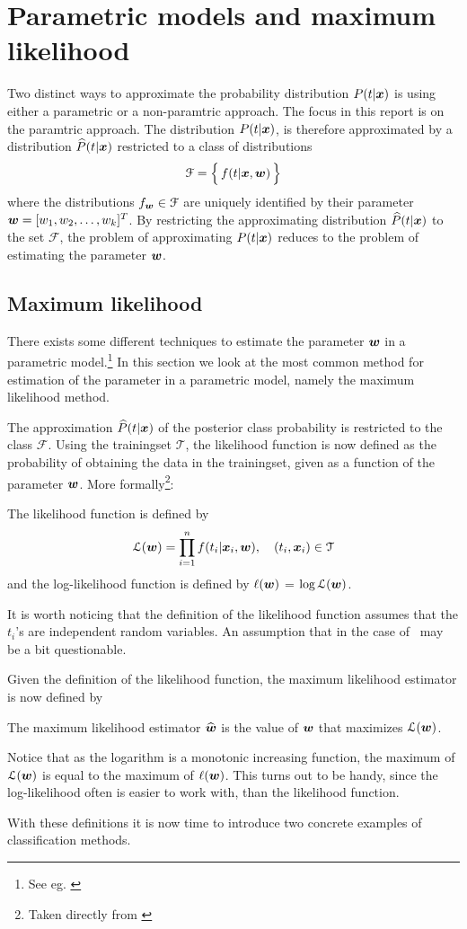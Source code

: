 \section{Parametric models and maximum likelihood}\label{sec:parametric-models-and-likelihood}
Two distinct ways to approximate the probability distribution $P(t|\boldsymbol{x})$ is using either a parametric or a non-paramtric approach. The focus in this report is on the paramtric approach. The distribution $P(t|\boldsymbol{x})$, is therefore approximated by a distribution $\widehat{P}(t|\boldsymbol{x})$ restricted to a class of distributions
\[
    \mathcal{F} = \Bigl\{\,f(t|\boldsymbol{x},\boldsymbol{w})\,\Bigr\}
\]
where the distributions $f_{\boldsymbol{w}}\in\mathcal{F}$ are uniquely identified by their parameter $\boldsymbol{w}=[w_1, w_2, \dots, w_k]^T$. By restricting the approximating distribution $\widehat{P}(t|\boldsymbol{x})$ to the set $\mathcal{F}$, the problem of approximating $P(t|\boldsymbol{x})$ reduces to the problem of estimating the parameter $\boldsymbol{w}$.

\subsection{Maximum likelihood}
There exists some different techniques to estimate the parameter $\boldsymbol{w}$ in a parametric model.\footnote{See eg. \citet[Sec.9]{wasserman04}} In this section we look at the most common method for estimation of the parameter in a parametric model, namely the maximum likelihood method.\par
The approximation $\widehat{P}(t|\boldsymbol{x})$ of the posterior class probability is restricted to the class $\mathcal{F}$. Using the trainingset $\mathcal{T}$, the likelihood function is now defined as the probability of obtaining the data in the trainingset, given as a function of the parameter $\boldsymbol{w}$. More formally\footnote{Taken directly from \citet[p.122]{wasserman04}}:
\begin{definition}
    The likelihood function is defined by
    \[
    \mathcal{L}(\boldsymbol{w}) = \prod_{i=1}^n f(t_i|\boldsymbol{x}_i,\boldsymbol{w}),\quad (t_i,\boldsymbol{x}_i)\in\mathcal{T}
    \]
    and the log-likelihood function is defined by $\ell(\boldsymbol{w})$ = $\log\mathcal{L(\boldsymbol{w})}$.
\end{definition}
It is worth noticing that the definition of the likelihood function assumes that the $t_i$'s are independent random variables. An assumption that in the case of \TFC\ may be a bit questionable. \par
Given the definition of the likelihood function, the maximum likelihood estimator is now defined by
\begin{definition}
    The maximum likelihood estimator $\widehat{\boldsymbol{w}}$ is the value of $\boldsymbol{w}$ that maximizes $\mathcal{L}(\boldsymbol{w})$.
\end{definition}
Notice that as the logarithm is a monotonic increasing function, the maximum of $\mathcal{L}(\boldsymbol{w})$ is equal to the maximum of $\ell(\boldsymbol{w})$. This turns out to be handy, since the log-likelihood often is easier to work with, than the likelihood function. \par
With these definitions it is now time to introduce two concrete examples of classification methods.



